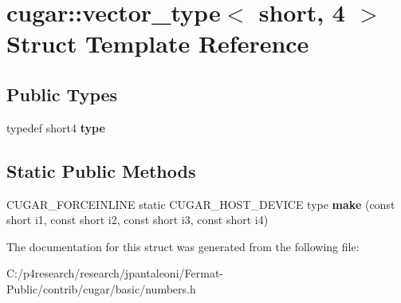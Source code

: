 \hypertarget{structcugar_1_1vector__type_3_01short_00_014_01_4}{}\section{cugar\+:\+:vector\+\_\+type$<$ short, 4 $>$ Struct Template Reference}
\label{structcugar_1_1vector__type_3_01short_00_014_01_4}
\subsection*{Public Types}
\begin{DoxyCompactItemize}
\item 
\mbox{\label{structcugar_1_1vector__type_3_01short_00_014_01_4_ad934b5d66295b39582ef0439e0d3be23}} 
typedef short4 {\bfseries type}
\end{DoxyCompactItemize}
\subsection*{Static Public Methods}
\begin{DoxyCompactItemize}
\item 
\mbox{\label{structcugar_1_1vector__type_3_01short_00_014_01_4_a1eca16b429edf7747614289e4cade2cd}} 
C\+U\+G\+A\+R\+\_\+\+F\+O\+R\+C\+E\+I\+N\+L\+I\+NE static C\+U\+G\+A\+R\+\_\+\+H\+O\+S\+T\+\_\+\+D\+E\+V\+I\+CE type {\bfseries make} (const short i1, const short i2, const short i3, const short i4)
\end{DoxyCompactItemize}


The documentation for this struct was generated from the following file\+:\begin{DoxyCompactItemize}
\item 
C\+:/p4research/research/jpantaleoni/\+Fermat-\/\+Public/contrib/cugar/basic/numbers.\+h\end{DoxyCompactItemize}
